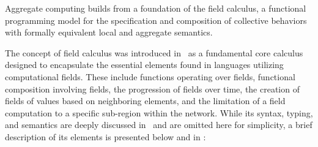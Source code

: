 Aggregate computing builds from a foundation of the field calculus, a functional programming model for the specification and composition of collective behaviors with formally equivalent local and aggregate semantics.

The concept of field calculus was introduced in~\cite{Viroli2013} as a fundamental core calculus designed to encapsulate the essential elements found in languages utilizing computational fields. These include functions operating over fields, functional composition involving fields, the progression of fields over time, the creation of fields of values based on neighboring elements, and the limitation of a field computation to a specific sub-region within the network. While its syntax, typing, and semantics are deeply discussed in~\cite{Viroli2019} and are omitted here for simplicity, a brief description of its elements is presented below and in :

